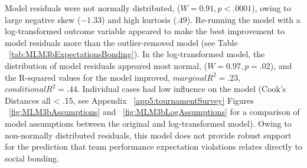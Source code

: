 Model residuals were not normally distributed, ($W = 0.91, p < .0001$), owing to large negative skew ($-1.33$) and high kurtosis ($.49$). Re-running the model with a log-transformed outcome variable appeared to make the best improvement to model residuals more than the outlier-removed model (see Table ~\ref{tab:MLM3bExpectationsBonding}). In the log-transformed model, the distribution of model residuals appeared most normal,  ($W = 0.97, p = .02$), and the R-squared values for the model improved, $marginal R^2 = .23$, $conditional R^2 = .44$.  Individual cases had low influence on the model (Cook's Distances all < .15, see Appendix ~\ref{app5:tournamentSurvey} Figures ~\ref{fig:MLM3bAssumptions} and ~\ref{fig:MLM3bLogAssumptions} for a comparison of model assumptions between the original and log-transformed model). Owing to non-normally distributed residuals, this model does not provide robust support for the prediction that team performance expectation violations relates directly to social bonding.


\restoregeometry










